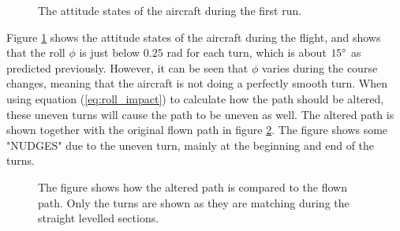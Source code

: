 \begin{figure}[!ht]
    \centering
    \caption{The attitude states of the aircraft during the first run.}
	\label{fig:first_run_states}
\end{figure}

Figure \ref{fig:first_run_states} shows the attitude states of the aircraft during the flight, and shows that the roll $\phi$ is just below $0.25$ rad for each turn, which is about $15 \degree$ as predicted previously. However, it can be seen that $\phi$ varies during the course changes, meaning that the aircraft is not doing a perfectly smooth turn. When using equation (\ref{eq:roll_impact}) to calculate how the path should be altered, these uneven turns will cause the path to be uneven as well. The altered path is shown together with the original flown path in figure \ref{fig:altered_vs_flown}. The figure shows some "NUDGES" due to the uneven turn, mainly at the beginning and end of the turns.

\begin{figure}[!ht]
    \centering
    \caption{The figure shows how the altered path is compared to the flown path. Only the turns are shown as they are matching during the straight levelled sections.}
	\label{fig:altered_vs_flown}
\end{figure}

